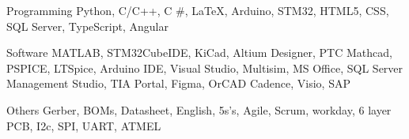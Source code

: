 


\begin{cvskills}


\cvskill
{Programming} %
{Python, C/C++, C \#, LaTeX, Arduino, STM32, HTML5, CSS, SQL Server, TypeScript, Angular} %


\cvskill
{Software} %
{MATLAB, STM32CubeIDE, KiCad, Altium Designer, PTC Mathcad, PSPICE, LTSpice, Arduino IDE, Visual Studio, Multisim, MS Office, SQL Server Management Studio, TIA Portal, Figma, OrCAD Cadence, Visio, SAP} %

\cvskill
{Others} %
{Gerber, BOMs, Datasheet, English, 5s's, Agile, Scrum, workday, 6 layer PCB, I2c, SPI, UART, ATMEL} %


\end{cvskills}